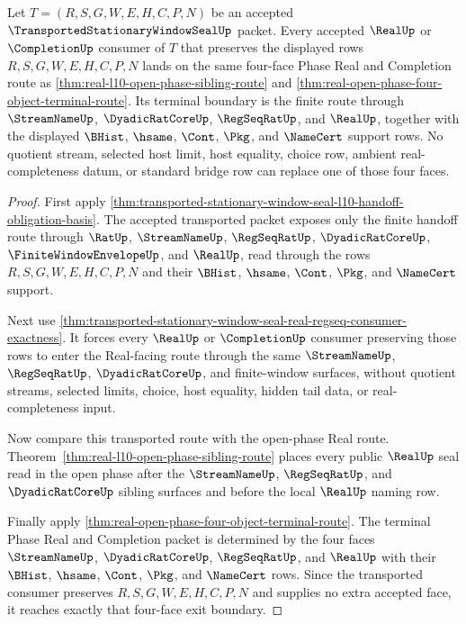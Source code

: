 \begin{theorem}
\label{thm:transported-stationary-window-seal-open-phase-exit-boundary}
Let $T=(R,S,G,W,E,H,C,P,N)$ be an accepted $\TransportedStationaryWindowSealUp$ packet. Every accepted $\RealUp$ or $\CompletionUp$ consumer of $T$ that preserves the displayed rows $R,S,G,W,E,H,C,P,N$ lands on the same four-face Phase Real and Completion route as \autoref{thm:real-l10-open-phase-sibling-route} and \autoref{thm:real-open-phase-four-object-terminal-route}. Its terminal boundary is the finite route through $\StreamNameUp$, $\DyadicRatCoreUp$, $\RegSeqRatUp$, and $\RealUp$, together with the displayed $\BHist$, $\hsame$, $\Cont$, $\Pkg$, and $\NameCert$ support rows. No quotient stream, selected host limit, host equality, choice row, ambient real-completeness datum, or standard bridge row can replace one of those four faces.
\end{theorem}
\begin{proof}
First apply \autoref{thm:transported-stationary-window-seal-l10-handoff-obligation-basis}. The accepted transported packet exposes only the finite handoff route through $\RatUp$, $\StreamNameUp$, $\RegSeqRatUp$, $\DyadicRatCoreUp$, $\FiniteWindowEnvelopeUp$, and $\RealUp$, read through the rows $R,S,G,W,E,H,C,P,N$ and their $\BHist$, $\hsame$, $\Cont$, $\Pkg$, and $\NameCert$ support.

Next use \autoref{thm:transported-stationary-window-seal-real-regseq-consumer-exactness}. It forces every $\RealUp$ or $\CompletionUp$ consumer preserving those rows to enter the Real-facing route through the same $\StreamNameUp$, $\RegSeqRatUp$, $\DyadicRatCoreUp$, and finite-window surfaces, without quotient streams, selected limits, choice, host equality, hidden tail data, or real-completeness input.

Now compare this transported route with the open-phase Real route. Theorem~\ref{thm:real-l10-open-phase-sibling-route} places every public $\RealUp$ seal read in the open phase after the $\StreamNameUp$, $\RegSeqRatUp$, and $\DyadicRatCoreUp$ sibling surfaces and before the local $\RealUp$ naming row.

Finally apply \autoref{thm:real-open-phase-four-object-terminal-route}. The terminal Phase Real and Completion packet is determined by the four faces $\StreamNameUp$, $\DyadicRatCoreUp$, $\RegSeqRatUp$, and $\RealUp$ with their $\BHist$, $\hsame$, $\Cont$, $\Pkg$, and $\NameCert$ rows. Since the transported consumer preserves $R,S,G,W,E,H,C,P,N$ and supplies no extra accepted face, it reaches exactly that four-face exit boundary.
\end{proof}
